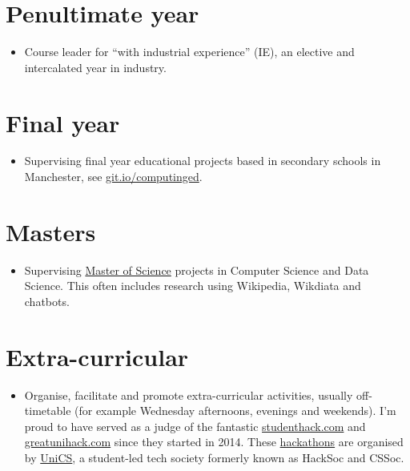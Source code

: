 \documentclass[12pt,]{book}
\providecommand{\tightlist}{%
  \setlength{\itemsep}{0pt}\setlength{\parskip}{0pt}}
\begin{document}
\hypertarget{penultimate-year}{%
\section{Penultimate year}\label{penultimate-year}}

\begin{itemize}
\tightlist
\item
  Course leader for ``with industrial experience'' (IE), an elective and intercalated year in industry.
\end{itemize}

\hypertarget{final-year}{%
\section{Final year}\label{final-year}}

\begin{itemize}
\tightlist
\item
  Supervising final year educational projects based in secondary schools in Manchester, see \href{https://git.io/computinged}{git.io/computinged}.
\end{itemize}

\hypertarget{masters}{%
\section{Masters}\label{masters}}

\begin{itemize}
\tightlist
\item
  Supervising \href{https://www.cs.manchester.ac.uk/study/masters/}{Master of Science} projects in Computer Science and Data Science. This often includes research using Wikipedia, Wikdiata and chatbots. 🤖
\end{itemize}

\hypertarget{extra-curricular}{%
\section{Extra-curricular}\label{extra-curricular}}

\begin{itemize}
\tightlist
\item
  Organise, facilitate and promote extra-curricular activities, usually off-timetable (for example Wednesday afternoons, evenings and weekends). I'm proud to have served as a judge of the fantastic \href{https://www.studenthack.com}{studenthack.com} and \href{https://greatunihack.com}{greatunihack.com} since they started in 2014. These \href{https://medium.com/tfogo/hackathons-are-for-beginners-77a9c9c0e000}{hackathons} are organised by \href{https://www.unicsmcr.com/}{UniCS}, a student-led tech society formerly known as HackSoc and CSSoc.
\end{itemize}
\end{document}
